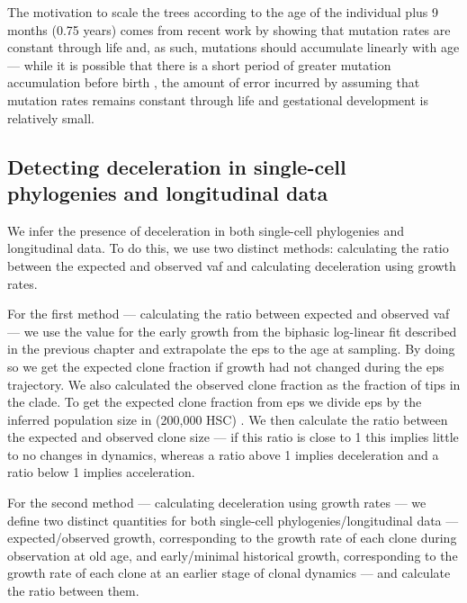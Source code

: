 The motivation to scale the trees according to the age of the individual plus 9 months (0.75 years) comes from recent work by  showing that mutation rates are constant through life \cite{Abascal_2021_gjvqfm} and, as such, mutations should accumulate linearly with age --- while it is possible that there is a short period of greater mutation accumulation before birth \cite{SpencerChapman_2021_gjz4x4}, the amount of error incurred by assuming that mutation rates remains constant through life and gestational development is relatively small. 

\subsection{Detecting deceleration in single-cell phylogenies and longitudinal data}

We infer the presence of deceleration in both single-cell phylogenies and longitudinal data. To do this, we use two distinct methods: calculating the ratio between the expected and observed \ac{vaf} and calculating deceleration using growth rates. 

For the first method --- calculating the ratio between expected and observed \ac{vaf} --- we use the value for the early growth from the biphasic log-linear fit described in the previous chapter and extrapolate the \ac{eps} to the age at sampling. By doing so we get the expected clone fraction if growth had not changed during the \ac{eps} trajectory. We also calculated the observed clone fraction as the fraction of tips in the clade. To get the expected clone fraction from \ac{eps} we divide \ac{eps} by the inferred population size in  (200,000 HSC) \cite{Lee-Six2018-lp}. We then calculate the ratio between the expected and observed clone size --- if this ratio is close to 1 this implies little to no changes in dynamics, whereas a ratio above 1 implies deceleration and a ratio below 1 implies acceleration.

For the second method --- calculating deceleration using growth rates --- we define two distinct quantities for both single-cell phylogenies/longitudinal data --- expected/observed growth, corresponding to the growth rate of each clone during observation at old age, and early/minimal historical growth, corresponding to the growth rate of each clone at an earlier stage of clonal dynamics --- and calculate the ratio between them.

